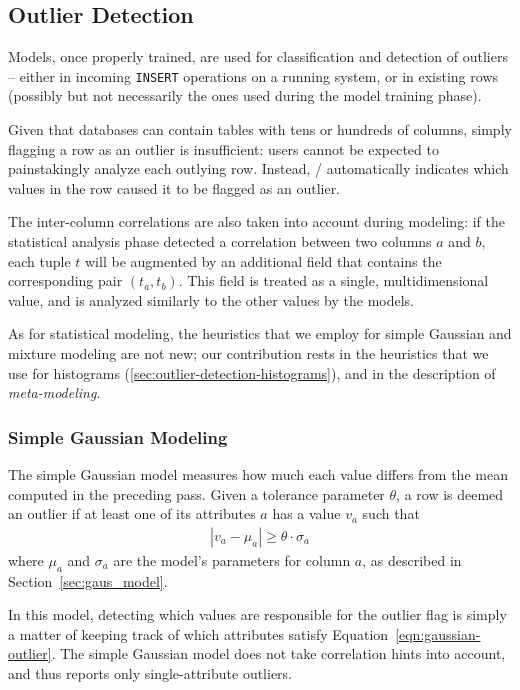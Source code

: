 \subsection{Outlier Detection}
\label{sec:outlier-detection}

Models, once properly trained, are used for classification and detection of outliers -- either in incoming \texttt{INSERT} operations on a running system, or in existing rows (possibly but not necessarily the ones used during the model training phase). %

Given that databases can contain tables with tens or hundreds of columns, simply flagging a row as an outlier is insufficient: users cannot be expected to painstakingly analyze each outlying row. Instead, \dBoost/ automatically indicates which values in the row caused it to be flagged as an outlier.

The inter-column correlations are also taken into account during modeling: if the statistical analysis phase detected a correlation between two columns $a$ and $b$, each tuple $t$ will be augmented by an additional field that contains the corresponding pair $(t_a, t_b)$. This field is treated as a single, multidimensional value, and is analyzed similarly to the other values by the models.

As for statistical modeling, the heuristics that we employ for simple Gaussian and mixture modeling are not new; our contribution rests in the heuristics that we use for histograms (\ref{sec:outlier-detection-histograms}), and in the description of \emph{meta-modeling}.

\subsubsection{Simple Gaussian Modeling}
The simple Gaussian model measures how much each value differs from the mean computed in the preceding pass. Given a tolerance parameter $\theta$, a row is deemed an outlier if at least one of its attributes $a$ has a value $v_a$ such that
\begin{align}
  |v_a - \mu_a| \ge \theta \cdot \sigma_a
  \label{eqn:gaussian-outlier}
\end{align}
where $\mu_a$ and $\sigma_a$ are the model's parameters for column $a$, as described in Section~\ref{sec:gaus_model}.

In this model, detecting which values are responsible for the outlier flag is simply a matter of keeping track of which attributes satisfy Equation~\eqref{eqn:gaussian-outlier}. The simple Gaussian model does not take correlation hints into account, and thus reports only single-attribute outliers.

